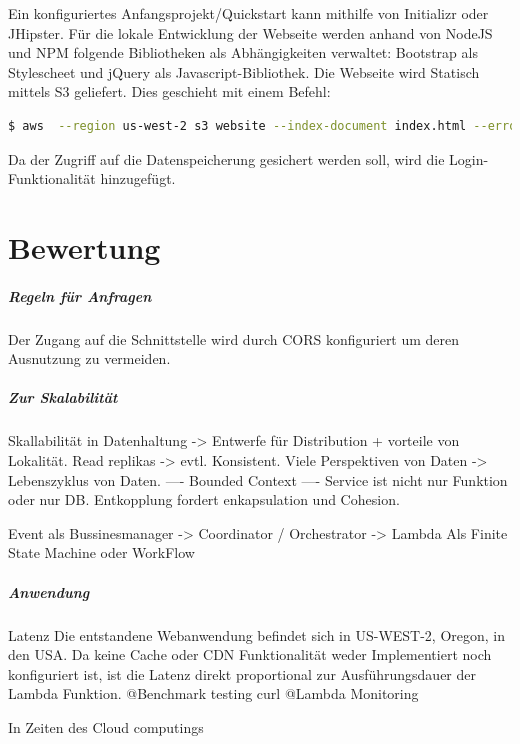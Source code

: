 \documentclass[
12pt,
english,
ngerman,
headsepline,
twoside,
openright,
numbers=noenddot,version=first
]{scrreprt}
\begin{document}
Ein konfiguriertes Anfangsprojekt/Quickstart kann mithilfe von Initializr\cite{Initializr} oder JHipster\cite{Jhipster}. Für die lokale Entwicklung der Webseite werden anhand von NodeJS und NPM folgende Bibliotheken als Abhängigkeiten verwaltet: Bootstrap als Stylescheet und jQuery als Javascript-Bibliothek.
Die Webseite wird Statisch mittels S3 geliefert. Dies geschieht mit einem Befehl: 
\begin{lstlisting}[language=BASH, caption={Webseite veröffentlichen}]
$ aws  --region us-west-2 s3 website --index-document index.html --error-document error.html 's3://koma.thb.de'
\end{lstlisting} 

Da der Zugriff auf die Datenspeicherung gesichert werden soll, wird die Login-Funktionalität hinzugefügt.


\chapter{Bewertung}

\paragraph{Regeln für Anfragen}
Der Zugang auf die Schnittstelle wird durch CORS konfiguriert um deren Ausnutzung zu vermeiden. 

\paragraph{Zur Skalabilität}
Skallabilität in Datenhaltung -> Entwerfe für Distribution + vorteile von Lokalität.
Read replikas -> evtl. Konsistent. 
Viele Perspektiven von Daten -> Lebenszyklus von Daten. 
---- Bounded Context ---- 
Service ist nicht nur Funktion oder nur DB.
Entkopplung fordert enkapsulation und Cohesion.

Event als Bussinesmanager -> Coordinator / Orchestrator -> Lambda
Als Finite State Machine oder WorkFlow

\paragraph{Anwendung}{Latenz}
Die entstandene Webanwendung befindet sich in US-WEST-2, Oregon, in den USA. 
Da keine Cache oder CDN Funktionalität weder Implementiert noch konfiguriert ist, ist die Latenz direkt proportional zur Ausführungsdauer der Lambda Funktion.
@Benchmark testing curl 
@Lambda Monitoring

In Zeiten des Cloud computings 
\end{document}

